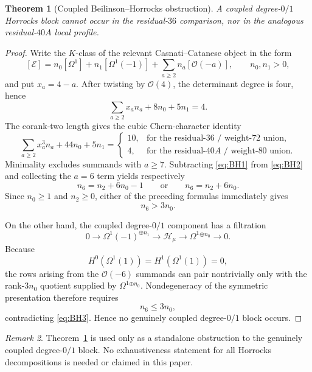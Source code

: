 \documentclass[11pt,reqno]{amsart}
\newtheorem{theorem}{Theorem}[section]
\theoremstyle{remark}
\newtheorem{remark}[theorem]{Remark}
\begin{document}
\begin{theorem}[Coupled Beilinson--Horrocks obstruction]\label{thm:regular}
A coupled degree-$0/1$ Horrocks block cannot occur in the residual-$36$ comparison, nor in the analogous residual-$40A$ local profile.
\end{theorem}

\begin{proof}
Write the $K$-class of the relevant Casnati--Catanese object in the form
\[
[\mathcal E]
=n_0[\Omega^1]+n_1[\Omega^1(-1)]
 +\sum_{a\ge2}n_a[\mathcal O(-a)],
\qquad n_0,n_1>0,
\]
and put $x_a=4-a$.  After twisting by $\mathcal O(4)$, the determinant degree is four, hence
\[
\sum_{a\ge2}x_an_a+8n_0+5n_1=4. \tag{BH1}\label{eq:BH1}
\]
The corank-two length gives the cubic Chern-character identity
\[
\sum_{a\ge2}x_a^3n_a+44n_0+5n_1
=\begin{cases}
10,&\text{for the residual-$36$ / weight-$72$ union},\\
4,&\text{for the residual-$40A$ / weight-$80$ union}.
\end{cases} \tag{BH2}\label{eq:BH2}
\]
Minimality excludes summands with $a\ge7$.  Subtracting \eqref{eq:BH1} from \eqref{eq:BH2} and collecting the $a=6$ term yields respectively
\[
n_6=n_2+6n_0-1
\qquad\text{or}\qquad
n_6=n_2+6n_0.
\]
Since $n_0\ge1$ and $n_2\ge0$, either of the preceding formulas immediately gives
\[
n_6>3n_0. \tag{BH3}\label{eq:BH3}
\]

On the other hand, the coupled degree-$0/1$ component has a filtration
\[
0\longrightarrow\Omega^1(-1)^{\oplus n_1}
\longrightarrow\mathcal H_\mu
\longrightarrow\Omega^1{}^{\oplus n_0}
\longrightarrow0.
\]
Because
\[
H^0(\Omega^1(1))=H^1(\Omega^1(1))=0,
\]
the rows arising from the $\mathcal O(-6)$ summands can pair nontrivially only with the rank-$3n_0$ quotient supplied by $\Omega^1{}^{\oplus n_0}$.  Nondegeneracy of the symmetric presentation therefore requires
\[
n_6\le3n_0,
\]
contradicting \eqref{eq:BH3}.  Hence no genuinely coupled degree-$0/1$ block occurs.
\end{proof}

\begin{remark}
Theorem~\ref{thm:regular} is used only as a standalone obstruction to the genuinely coupled degree-$0/1$ block.  No exhaustiveness statement for all Horrocks decompositions is needed or claimed in this paper.
\end{remark}

\iffalse
\end{document}
